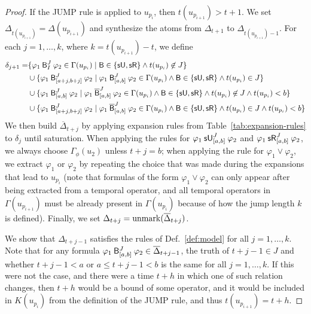 \documentclass[acmsmall,screen]{acmart}
\begin{document}
\begin{proof}
If the \textsf{JUMP} rule is applied to $u_{p_i}$, then $t(u_{p_{i+1}}) > t + 1$.
We set $\Delta_{t(u_{p_{i+1}})} = \Delta(u_{p_{i+1}})$
and synthesize the atoms from $\Delta_{t+1}$ to $\Delta_{t(u_{p_{i+1}})-1}$.
For each $j = 1, \dots, k$, where $k = t(u_{p_{i+1}}) - t$, we define
\begin{align*}
\delta_{j+1} =
&\set{\anybinop[J]{I}{\varphi_1}{\varphi_2} \in \Gamma(u_{p_i}) \mid \mathsf{B} \in \set{\suntilop, \sreleaseop} \land t(u_{p_i}) \not\in J} \\
&\cup
\set{\anybinop[J]{[a+j, b+j]}{\varphi_1}{\varphi_2} \mid \anybinop[J]{[a,b]}{\varphi_1}{\varphi_2} \in \Gamma(u_{p_i}) \land \mathsf{B} \in \set{\suntilop, \sreleaseop} \land t(u_{p_i}) \in J} \\
&\cup
\set{\anybinop[J]{[a,b]}{\varphi_1}{\varphi_2} \mid \stlbinop[J]{\marked{\mathsf{B}}}{[a,b]}{\varphi_1}{\varphi_2} \in \Gamma(u_{p_i}) \land \mathsf{B} \in \set{\suntilop, \sreleaseop} \land t(u_{p_i}) \not\in J \land t(u_{p_i}) < b} \\
&\cup
\set{\anybinop[J]{[a+j,b+j]}{\varphi_1}{\varphi_2} \mid \stlbinop[J]{\marked{\mathsf{B}}}{[a,b]}{\varphi_1}{\varphi_2} \in \Gamma(u_{p_i}) \land \mathsf{B} \in \set{\suntilop, \sreleaseop} \land t(u_{p_i}) \in J \land t(u_{p_i}) < b}
\end{align*}
We then build $\overline{\Delta}_{t+j}$ by applying expansion rules from Table~\ref{tab:expansion-rules} to $\delta_j$ until saturation.
When applying the rules for $\suntil[J]{[a,b]}{\varphi_1}{\varphi_2}$
and $\srelease[J]{[a,b]}{\varphi_1}{\varphi_2}$, we always choose $\Gamma_\phi(u_2)$ unless $t+j = b$;
when applying the rule for $\varphi_1 \lor \varphi_2$,
we extract $\varphi_1$ or $\varphi_2$ by repeating the choice that was made during the expansions
that lead to $u_{p_i}$
(note that formulas of the form $\varphi_1 \lor \varphi_2$ can only appear after being extracted from a temporal operator, and all temporal operators in $\Gamma(u_{p_{i+1}})$ must be already present in $\Gamma(u_{p_i})$ because of how the jump length $k$ is defined).
Finally, we set $\Delta_{t+j} = \unmark(\overline{\Delta}_{t+j})$.

We show that $\Delta_{t+j-1}$ satisfies the rules of Def.~\ref{def:model} for all $j = 1, \dots, k$.
Note that for any formula $\anybinop[J]{[a,b]}{\varphi_1}{\varphi_2} \in \overline{\Delta}_{t+j-1}$,
the truth of $t+j-1 \in J$ and whether $t+j-1 < a$ or $a \leq t+j-1 < b$
is the same for all $j = 1, \dots, k$.
If this were not the case, and there were a time $t+h$ in which one of such relation changes,
then $t+h$ would be a bound of some operator, and it would be included in $K(u_{p_i})$ from the definition of the \textsf{JUMP} rule,
and thus $t(u_{p_{i+1}}) = t+h$.


\end{proof}
\end{document}
